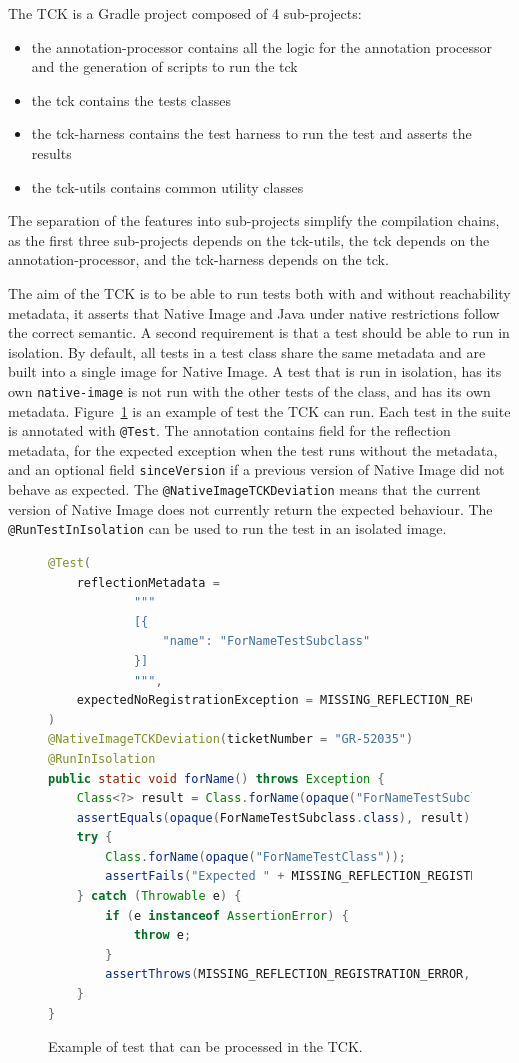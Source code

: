 The TCK is a Gradle project composed of 4 sub-projects: 
\begin{itemize}
    \item the annotation-processor contains all the logic for the annotation processor and the generation of scripts to run the tck
    \item the tck contains the tests classes
    \item the tck-harness contains the test harness to run the test and asserts the results
    \item the tck-utils contains common utility classes
\end{itemize}
The separation of the features into sub-projects simplify the compilation chains, as the first three sub-projects depends on the tck-utils, the tck depends on the annotation-processor, and the tck-harness depends on the tck.

The aim of the TCK is to be able to run tests both with and without reachability metadata, it asserts that Native Image and Java under native restrictions follow the correct semantic. A second requirement is that a test should be able to run in isolation. By default, all tests in a test class share the same metadata and are built into a single image for Native Image. A test that is run in isolation, has its own \verb|native-image| is not run with the other tests of the class, and has its own metadata.  
Figure~\ref{fig:tck_for_name} is an example of test the TCK can run. Each test in the suite is annotated with \verb|@Test|. The annotation contains field for the reflection metadata, for the expected exception when the test runs without the metadata, and an optional field \verb|sinceVersion| if a previous version of Native Image did not behave as expected. The \verb|@NativeImageTCKDeviation| means that the current version of Native Image does not currently return the expected behaviour.
The \verb|@RunTestInIsolation| can be used to run the test in an isolated image. 

\begin{figure}[ht]
    \centering
\begin{lstlisting}[language=Java]
@Test(
    reflectionMetadata =
            """
            [{
                "name": "ForNameTestSubclass"
            }]
            """,
    expectedNoRegistrationException = MISSING_REFLECTION_REGISTRATION_ERROR
)
@NativeImageTCKDeviation(ticketNumber = "GR-52035")
@RunInIsolation
public static void forName() throws Exception {
    Class<?> result = Class.forName(opaque("ForNameTestSubclass"));
    assertEquals(opaque(ForNameTestSubclass.class), result);
    try {
        Class.forName(opaque("ForNameTestClass"));
        assertFails("Expected " + MISSING_REFLECTION_REGISTRATION_ERROR + " to be thrown.");
    } catch (Throwable e) {
        if (e instanceof AssertionError) {
            throw e;
        }
        assertThrows(MISSING_REFLECTION_REGISTRATION_ERROR, e);
    }
}
\end{lstlisting}
    \caption{Example of test that can be processed in the TCK.}
    \label{fig:tck_for_name}
\end{figure}

